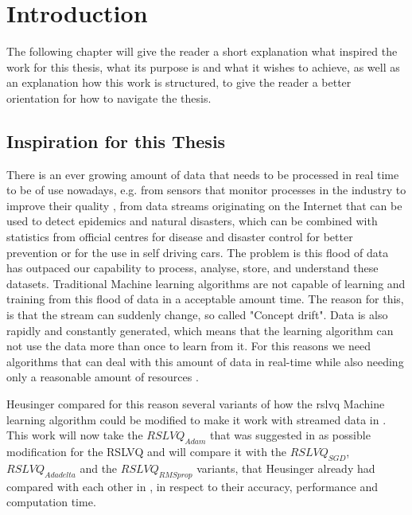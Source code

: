 \documentclass[12pt,oneside,a4paper,parskip]{scrbook}
\begin{document}
\tableofcontents	




\mainmatter

\chapter{Introduction}\label{ch:intro}

The following chapter will give the reader a short explanation what inspired the work for this thesis, what its purpose is 
and what it wishes to achieve, as well as an explanation how this work is structured, to give the reader a better orientation 
for how to navigate the thesis.

\section{Inspiration for this Thesis} 
There is an ever growing amount of data that needs to be processed in real time to be of use nowadays, e.g. from sensors that 
monitor processes in the industry to improve their quality \cite{MLonDataStreams}, from data streams originating on 
the Internet that can be used to detect epidemics and natural disasters, which can be combined with statistics from 
official centres for disease and disaster control for better prevention \cite{MLonDataStreams} or for the use in self driving
cars.
The problem is this flood of data has outpaced our capability to process, analyse, store, and understand these datasets.
Traditional Machine learning algorithms are not capable of learning and training from this flood of data in a acceptable 
amount time. The reason for this, is that the stream can suddenly change, so called "Concept drift". Data is also 
rapidly and constantly generated, which means that the learning algorithm can not use the data more than once to learn 
from it.
For this reasons we need algorithms that can deal with this amount of data in real-time while also needing only a 
reasonable amount of resources \cite{MLonDataStreams}.

Heusinger compared for this reason several variants of how the \ac{rslvq} Machine learning algorithm could be modified
to make it work with streamed data in \cite{PassiveDriftonRSLVQ}.
This work will now take the $RSLVQ_\textit{Adam}$ that was suggested in \cite{overvieDiffRSLVQ} as possible modification 
for the RSLVQ and will compare it with the $RSLVQ_\textit{SGD}$, $RSLVQ_\textit{Adadelta}$ and the $RSLVQ_\textit{RMSprop}$ 
variants, that Heusinger already had compared with each other in \cite{PassiveDriftonRSLVQ},  
in respect to their accuracy, performance and computation time.
\end{document}
